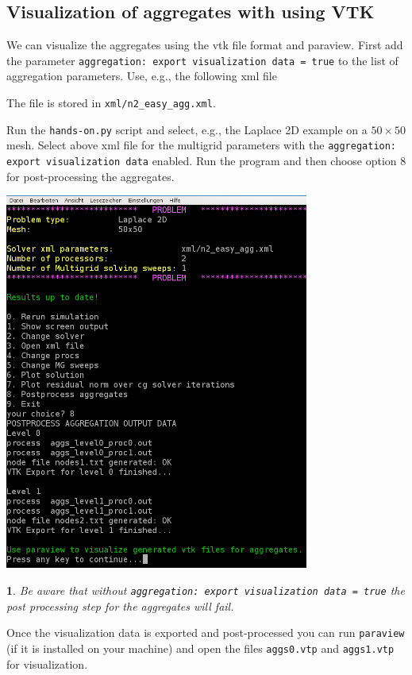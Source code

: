 \documentclass[10pt,fleqn]{book}
\newtheorem*{mycomment}{\ding{42}}
\begin{document}
\subsection{Visualization of aggregates with \muelu using VTK}
We can visualize the aggregates using the vtk file format and paraview. First add the parameter \texttt{aggregation: export visualization data = true} to the list of aggregation parameters. Use, e.g., the following xml file

The file is stored in \texttt{xml/n2\_easy\_agg.xml}.

Run the \texttt{hands-on.py} script and select, e.g., the Laplace 2D example on a $50\times 50$ mesh. Select above xml file for the multigrid parameters with the \texttt{aggregation: export visualization data} enabled. Run the program and then choose option 8 for post-processing the aggregates.
\begin{center}\includegraphics[width=10cm]{pics/tut1_14.png} \end{center}
\begin{mycomment}
Be aware that without \texttt{aggregation: export visualization data = true} the post processing step for the aggregates will fail.
\end{mycomment}

Once the visualization data is exported and post-processed you can run \texttt{paraview} (if it is installed on your machine) and open the files \texttt{aggs0.vtp} and \texttt{aggs1.vtp} for visualization.
\end{document}
